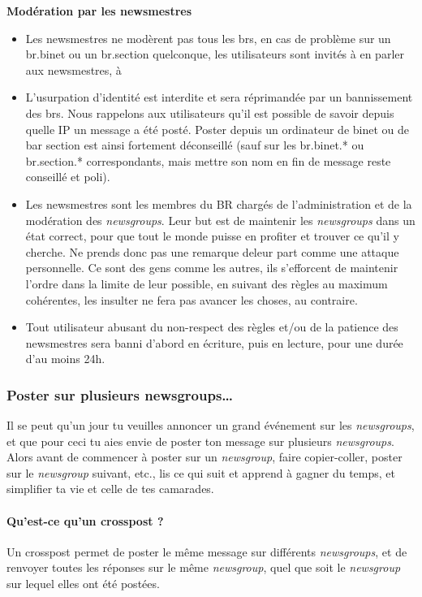 \textbf{Modération par les newsmestres}
\begin{itemize}
 \item Les newsmestres ne modèrent pas tous les brs, en cas de problème sur un br.binet ou un br.section quelconque, les utilisateurs sont invités à en parler aux newsmestres, à 
 \item L'usurpation d'identité est interdite et sera réprimandée par un bannissement des brs. Nous rappelons aux utilisateurs qu'il est possible de savoir depuis quelle IP un message a été posté. Poster depuis un ordinateur de binet ou de bar section est ainsi fortement déconseillé (sauf sur les br.binet.* ou br.section.* correspondants, mais mettre son nom en fin de message reste conseillé et poli).
 \item Les newsmestres sont les membres du BR chargés de l'administration et de la modération des \emph{newsgroups}. Leur but est de maintenir les \emph{newsgroups} dans un état correct, pour que tout le monde puisse en profiter et trouver ce qu'il y cherche. Ne prends donc pas une remarque deleur part comme une attaque personnelle. Ce sont des gens comme les autres, ils s'efforcent de maintenir l'ordre dans la limite de leur possible, en suivant des règles au maximum cohérentes, les insulter ne fera pas avancer les choses, au contraire.
 \item Tout utilisateur abusant du non-respect des règles et/ou de la patience des newsmestres sera banni d'abord en écriture, puis en lecture, pour une durée d'au moins 24h.
\end{itemize}


\subsubsection{Poster sur plusieurs newsgroups\dots }



Il se peut qu'un jour tu veuilles annoncer un grand événement sur les \emph{newsgroups}, et que pour ceci tu aies envie de poster ton message sur
plusieurs \emph{newsgroups}. Alors avant de commencer à poster sur un \emph{newsgroup}, faire copier-coller, poster sur le \emph{newsgroup} suivant,
etc., lis ce qui suit et apprend à gagner du temps, et simplifier ta vie et celle de tes camarades.

\paragraph{Qu'est-ce qu'un crosspost ?}
Un crosspost permet de poster le même message sur différents \emph{newsgroups}, et de renvoyer toutes les réponses sur le même \emph{newsgroup}, quel
que soit le \emph{newsgroup} sur lequel elles ont été postées.


